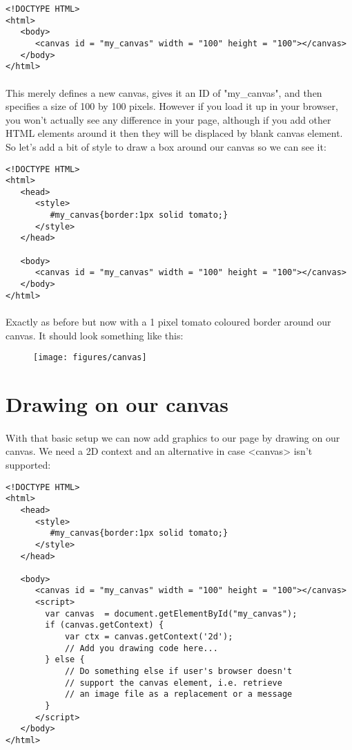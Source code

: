 \begin{lstlisting}
<!DOCTYPE HTML>
<html>
   <body>
      <canvas id = "my_canvas" width = "100" height = "100"></canvas>
   </body>
</html>
\end{lstlisting}

\paragraph{} This merely defines a new canvas, gives it an ID of "my\_canvas", and then specifies a size of 100 by 100 pixels. However if you load it up in your browser, you won't actually see any difference in your page, although if you add other HTML elements around it then they will be displaced by blank canvas element. So let's add a bit of style to draw a box around our canvas so we can see it:

\begin{lstlisting}
<!DOCTYPE HTML>
<html>
   <head>
      <style>
         #my_canvas{border:1px solid tomato;}
      </style>
   </head>
   
   <body>
      <canvas id = "my_canvas" width = "100" height = "100"></canvas>
   </body>
</html>
\end{lstlisting}

\paragraph{} Exactly as before but now with a 1 pixel tomato coloured border around our canvas. It should look something like this:

\begin{figure}[H]
\centering
\texttt{[image: figures/canvas]}
\label{fig:canvas}
\caption{}
\end{figure}



\section{Drawing on our canvas}
\paragraph{} With that basic setup we can now add graphics to our page by drawing on our canvas. We need a 2D context and an alternative in case <canvas> isn’t supported:

\begin{lstlisting}
<!DOCTYPE HTML>
<html>
   <head>
      <style>
         #my_canvas{border:1px solid tomato;}
      </style>
   </head>
   
   <body>
      <canvas id = "my_canvas" width = "100" height = "100"></canvas>
      <script>
        var canvas  = document.getElementById("my_canvas");
        if (canvas.getContext) {   
            var ctx = canvas.getContext('2d');   
            // Add you drawing code here...
        } else {      
            // Do something else if user's browser doesn't
            // support the canvas element, i.e. retrieve
            // an image file as a replacement or a message
        } 
      </script>
   </body>
</html>
\end{lstlisting}


